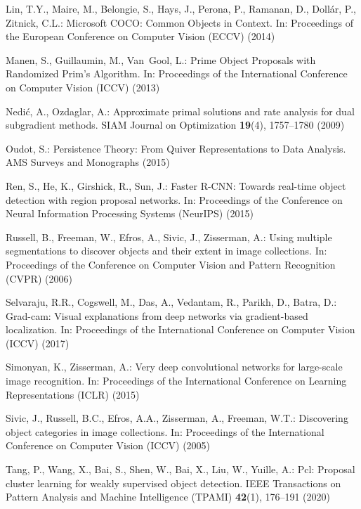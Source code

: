 \documentclass[runningheads]{llncs}
\begin{document}
\begin{thebibliography}{10}
Lin, T.Y., Maire, M., Belongie, S., Hays, J., Perona, P., Ramanan, D., Dollár,
  P., Zitnick, C.L.: Microsoft {COCO}: {Common Objects in Context}. In:
  Proceedings of the European Conference on Computer Vision ({ECCV}) (2014)

Manen, S., Guillaumin, M., Van~Gool, L.: {Prime Object Proposals with
  Randomized Prim's Algorithm}. In: Proceedings of the International Conference
  on Computer Vision ({ICCV}) (2013)

Nedi\'c, A., Ozdaglar, A.: Approximate primal solutions and rate analysis for
  dual subgradient methods. SIAM Journal on Optimization  \textbf{19}(4),
  1757--1780 (2009)

Oudot, S.: {Persistence Theory: From Quiver Representations to Data Analysis}.
  AMS Surveys and Monographs  (2015)

Ren, S., He, K., Girshick, R., Sun, J.: {Faster R-CNN}: Towards real-time
  object detection with region proposal networks. In: Proceedings of the
  Conference on Neural Information Processing Systems ({NeurIPS}) (2015)

Russell, B., Freeman, W., Efros, A., Sivic, J., Zisserman, A.: Using multiple
  segmentations to discover objects and their extent in image collections. In:
  Proceedings of the Conference on Computer Vision and Pattern Recognition
  ({CVPR}) (2006)

Selvaraju, R.R., Cogswell, M., Das, A., Vedantam, R., Parikh, D., Batra, D.:
  Grad-cam: Visual explanations from deep networks via gradient-based
  localization. In: Proceedings of the International Conference on Computer
  Vision ({ICCV}) (2017)

Simonyan, K., Zisserman, A.: Very deep convolutional networks for large-scale
  image recognition. In: Proceedings of the International Conference on
  Learning Representations (ICLR) (2015)

Sivic, J., Russell, B.C., Efros, A.A., Zisserman, A., Freeman, W.T.:
  Discovering object categories in image collections. In: Proceedings of the
  International Conference on Computer Vision ({ICCV}) (2005)

Tang, P., Wang, X., Bai, S., Shen, W., Bai, X., Liu, W., Yuille, A.: Pcl:
  Proposal cluster learning for weakly supervised object detection. IEEE
  Transactions on Pattern Analysis and Machine Intelligence ({TPAMI})
  \textbf{42}(1),  176--191 (2020)


\end{thebibliography}
\end{document}
